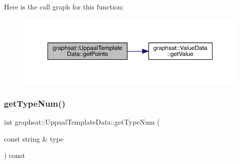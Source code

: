 Here is the call graph for this function\+:
\nopagebreak
\begin{figure}[H]
\begin{center}
\leavevmode
\includegraphics[width=350pt]{classgraphsat_1_1_uppaal_template_data_a76289e5eff0365afcb4b108c9e3af34f_cgraph}
\end{center}
\end{figure}
\mbox{\label{classgraphsat_1_1_uppaal_template_data_a68e36b69f936aea39f9bb0c76d7c1dc9}} 
\subsubsection{\texorpdfstring{getTypeNum()}{getTypeNum()}}
{\footnotesize\ttfamily int graphsat\+::\+Uppaal\+Template\+Data\+::get\+Type\+Num (\begin{DoxyParamCaption}\item[{const string \&}]{type }\end{DoxyParamCaption}) const\hspace{0.3cm}{\ttfamily [inline]}}

